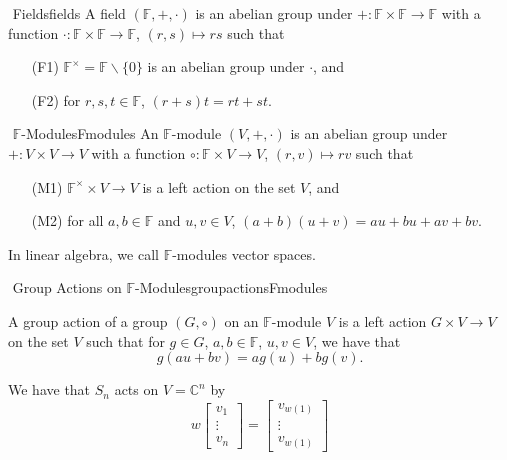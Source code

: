         \begin{definition}{\Stop\,\,Fields}{fields}
            A field \((\mathbb{F},+,\cdot)\) is an abelian group under \(+:\mathbb{F}\times\mathbb{F}\to\mathbb{F}\) with a function \(\cdot:\mathbb{F}\times\mathbb{F}\to\mathbb{F}\), \((r,s)\mapsto rs\) such that
            \begin{enumerate}
                \item[(F1)] \(\mathbb{F}^\times=\mathbb{F}\backslash\{0\}\) is an abelian group under \(\cdot\), and
                \item[(F2)] for \(r,s,t\in\mathbb{F}\), \((r+s)t=rt+st\). 
            \end{enumerate}
        \end{definition}
        \begin{definition}{\Stop\,\,\(\mathbb{F}\)-Modules}{Fmodules}
            An \(\mathbb{F}\)-module \((V,+,\cdot)\) is an abelian group under \(+:V\times V\to V\) with a function \(\circ:\mathbb{F}\times V\to V\), \((r,v)\mapsto rv\) such that
            \begin{enumerate}
                \item[(M1)] \(\mathbb{F}^\times\times V\to V\) is a left action on the set \(V\), and
                \item[(M2)] for all \(a,b\in\mathbb{F}\) and \(u,v\in V\), \((a+b)(u+v)=au+bu+av+bv\). 
            \end{enumerate}
        \end{definition}
        \begin{remark*}
            In linear algebra, we call \(\mathbb{F}\)-modules vector spaces.
        \end{remark*}
        \begin{definition}{\Stop\,\,Group Actions on \(\mathbb{F}\)-Modules}{groupactionsFmodules}
            
            A group action of a group \((G,\circ)\) on an \(\mathbb{F}\)-module \(V\) is a left action \(G\times V\to V\) on the set \(V\) such that for \(g\in G\), \(a,b\in\mathbb{F}\), \(u,v\in V\), we have that
            \begin{equation*}
                g(au+bv)=ag(u)+bg(v).
            \end{equation*}

        \end{definition}
        \begin{example}
            We have that \(S_n\) acts on \(V=\mathbb{C}^n\) by
            \begin{equation*}
                w\begin{bmatrix}
                    v_1 \\ \vdots \\ v_n
                \end{bmatrix}=\begin{bmatrix}
                    v_{w(1)} \\ \vdots \\ v_{w(1)}
                \end{bmatrix}
            \end{equation*}
        \end{example}
